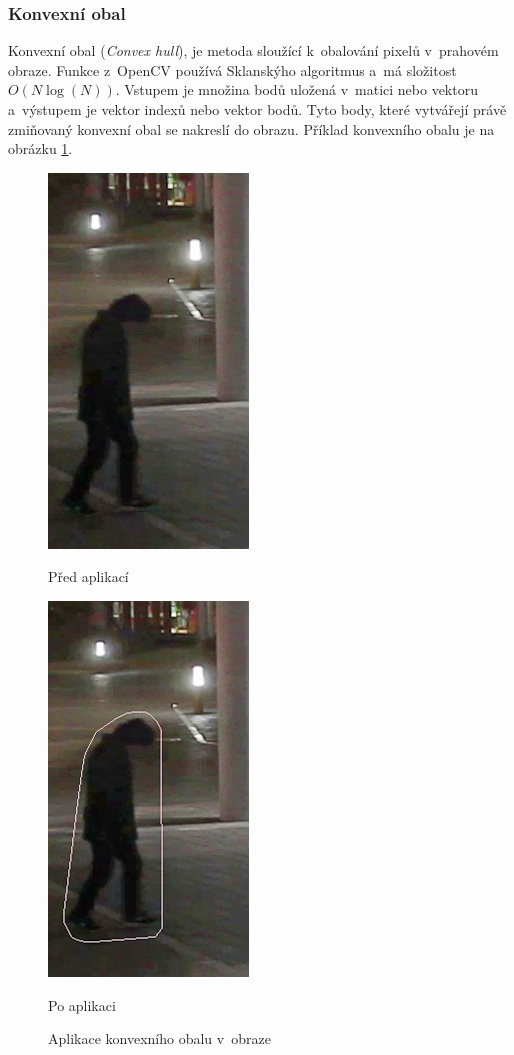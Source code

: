 \subsubsection*{Konvexní obal}
Konvexní obal (\textit{Convex hull}), je metoda sloužící k~obalování pixelů v~prahovém obraze. Funkce z~OpenCV používá Sklanskýho algoritmus \cite{openCV:sklansky} a~má složitost  $O(N \log(N))$. Vstupem je množina bodů uložená v~matici nebo vektoru a~výstupem je vektor indexů nebo vektor bodů. Tyto body, které vytvářejí právě zmiňovaný konvexní obal se nakreslí do obrazu.
Příklad konvexního obalu je na obrázku \ref{fig:convexHull}.
\begin{figure}[H]
\centering
\begin{minipage}{.5\textwidth}
  \centering
  \includegraphics[width=.3\linewidth]{figures/Hull_Original}
  \caption*{Před aplikací}
  \label{fig:original}
\end{minipage}%
\begin{minipage}{.5\textwidth}
  \centering
  \includegraphics[width=.3\linewidth]{figures/Hull_Result}
  \caption*{Po aplikaci}
  \label{fig:result}
\end{minipage}
\caption{Aplikace konvexního obalu v~obraze}
\label{fig:convexHull}
\end{figure} 


